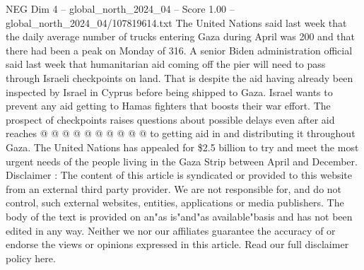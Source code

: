 \begin{textsample}{NEG Dim 4 – global\_north\_2024\_04 – Score 1.00 – global\_north\_2024\_04/107819614.txt}
The United Nations said last week that the daily average number of trucks entering Gaza during April was 200 and that there had been a peak on Monday of 316.
A senior Biden administration official said last week that humanitarian aid coming off the pier will need to pass through Israeli checkpoints on land.
That is despite the aid having already been inspected by Israel in Cyprus before being shipped to Gaza.
Israel wants to prevent any aid getting to Hamas fighters that boosts their war effort.
The prospect of checkpoints raises questions about possible delays even after aid reaches @ @ @ @ @ @ @ @ @ @ to getting aid in and distributing it throughout Gaza.
The United Nations has appealed for \$2.5 billion to try and meet the most urgent needs of the people living in the Gaza Strip between April and December.
Disclaimer : The content of this article is syndicated or provided to this website from an external third party provider.
We are not responsible for, and do not control, such external websites, entities, applications or media publishers.
The body of the text is provided on an"as is"and"as available"basis and has not been edited in any way.
Neither we nor our affiliates guarantee the accuracy of or endorse the views or opinions expressed in this article.
Read our full disclaimer policy here.

\end{textsample}
